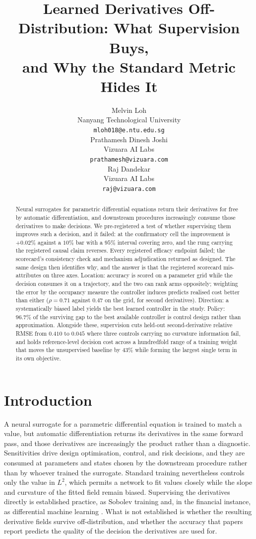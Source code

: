 \documentclass{article}
\title{Learned Derivatives Off-Distribution: What Supervision Buys,\\
and Why the Standard Metric Hides It}
\author{%
  Melvin Loh \\
  Nanyang Technological University \\
  \texttt{mloh018@e.ntu.edu.sg} \\
  \And
  Prathamesh Dinesh Joshi \\
  Vizuara AI Labs \\
  \texttt{prathamesh@vizuara.com} \\
  \And
  Raj Dandekar \\
  Vizuara AI Labs \\
  \texttt{raj@vizuara.com} \\
}
\begin{document}
\maketitle

\begin{abstract}
Neural surrogates for parametric differential equations return their derivatives for
free by automatic differentiation, and downstream procedures increasingly consume
those derivatives to make decisions. We pre-registered a test of whether supervising
them improves such a decision, and it failed: at the confirmatory cell the
improvement is $+0.02\%$ against a $10\%$ bar with a $95\%$ interval covering zero,
and the rung carrying the registered causal claim reverses. Every registered
efficacy endpoint failed; the scorecard's consistency check and mechanism
adjudication returned as designed. The same design then identifies why, and the
answer is that the registered scorecard mis-attributes on three axes. Location:
accuracy is scored on a parameter grid while the decision consumes it on a
trajectory, and the two can rank arms oppositely; weighting the error by the
occupancy measure the controller induces predicts realised cost better than either
($\rho = 0.71$ against $0.47$ on the grid, for second derivatives). Direction: a
systematically biased label yields the best learned controller in the study.
Policy: $96.7\%$ of the surviving gap to the best available controller is control
design rather than approximation. Alongside these, supervision cuts held-out
second-derivative relative RMSE from $0.410$ to $0.045$ where three controls
carrying no curvature information fail, and holds reference-level decision cost
across a hundredfold range of a training weight that moves the unsupervised baseline
by $43\%$ while forming the largest single term in its own objective.
\end{abstract}

\section{Introduction}
\label{sec:intro}

A neural surrogate for a parametric differential equation is trained to match a
value, but automatic differentiation returns its derivatives in the same forward
pass, and those derivatives are increasingly the product rather than a diagnostic.
Sensitivities drive design optimisation, control, and risk decisions, and they are
consumed at parameters and states chosen by the downstream procedure rather than by
whoever trained the surrogate. Standard training nevertheless controls only the
value in $L^{2}$, which permits a network to fit values closely while the slope and
curvature of the fitted field remain biased. Supervising the derivatives directly is
established practice, as Sobolev training \citep{czarnecki2017sobolev} and, in the
financial instance, as differential machine learning
\citep{huge2020differential}. What is not established is whether the resulting
derivative fields survive off-distribution, and whether the accuracy that papers
report predicts the quality of the decision the derivatives are used for.
\end{document}
